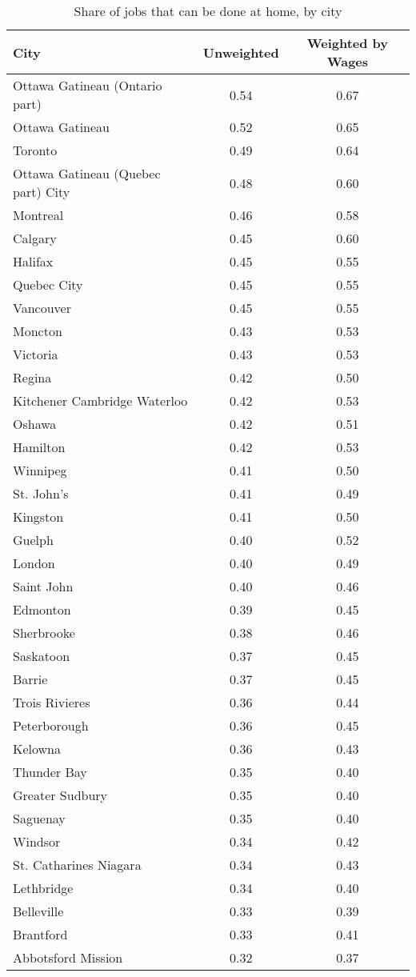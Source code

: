 \begin{table}[ht]
\centering
\caption{Share of jobs that can be done at home, by city} 
\label{tab:cities}
\begin{tabular}{lcc}
  \hline
City & Unweighted & Weighted by Wages \\ 
  \hline
Ottawa   Gatineau (Ontario part) & 0.54 & 0.67 \\ 
  Ottawa   Gatineau & 0.52 & 0.65 \\ 
  Toronto & 0.49 & 0.64 \\ 
  Ottawa   Gatineau (Quebec part) City & 0.48 & 0.60 \\ 
  Montreal & 0.46 & 0.58 \\ 
  Calgary & 0.45 & 0.60 \\ 
  Halifax & 0.45 & 0.55 \\ 
  Quebec City & 0.45 & 0.55 \\ 
  Vancouver & 0.45 & 0.55 \\ 
  Moncton & 0.43 & 0.53 \\ 
  Victoria & 0.43 & 0.53 \\ 
  Regina & 0.42 & 0.50 \\ 
  Kitchener   Cambridge   Waterloo & 0.42 & 0.53 \\ 
  Oshawa & 0.42 & 0.51 \\ 
  Hamilton & 0.42 & 0.53 \\ 
  Winnipeg & 0.41 & 0.50 \\ 
  St. John's & 0.41 & 0.49 \\ 
  Kingston & 0.41 & 0.50 \\ 
  Guelph & 0.40 & 0.52 \\ 
  London & 0.40 & 0.49 \\ 
  Saint John & 0.40 & 0.46 \\ 
  Edmonton & 0.39 & 0.45 \\ 
  Sherbrooke & 0.38 & 0.46 \\ 
  Saskatoon & 0.37 & 0.45 \\ 
  Barrie & 0.37 & 0.45 \\ 
  Trois Rivieres & 0.36 & 0.44 \\ 
  Peterborough & 0.36 & 0.45 \\ 
  Kelowna & 0.36 & 0.43 \\ 
  Thunder Bay & 0.35 & 0.40 \\ 
  Greater Sudbury & 0.35 & 0.40 \\ 
  Saguenay & 0.35 & 0.40 \\ 
  Windsor & 0.34 & 0.42 \\ 
  St. Catharines   Niagara & 0.34 & 0.43 \\ 
  Lethbridge & 0.34 & 0.40 \\ 
  Belleville & 0.33 & 0.39 \\ 
  Brantford & 0.33 & 0.41 \\ 
  Abbotsford   Mission & 0.32 & 0.37 \\ 
   \hline
\end{tabular}
\end{table}
